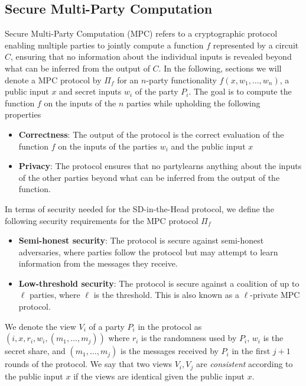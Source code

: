 \documentclass[twoside,11pt,openright]{report}
\theoremstyle{definition}
\theoremstyle{plain}
\begin{document}
\subsection{Secure Multi-Party Computation}\label{sec:mpc}

Secure Multi-Party Computation (MPC) refers to a cryptographic protocol enabling multiple parties to jointly compute a function $f$ represented by a circuit $C$, ensuring that no information about the individual inputs is revealed beyond what can be inferred from the output of $C$. In the following, sections we will denote a MPC protocol by $\Pi_f$ for an $n$-party functionality $f(x, w_1, \dots, w_n)$, a public input $x$ and secret inputs $w_i$ of the party $P_i$. The goal is to compute the function $f$ on the inputs of the $n$ parties while upholding the following properties~\cite{cramer2015secure}

\begin{itemize}
  \item \textbf{Correctness}: The output of the protocol is the correct evaluation of the function $f$ on the inputs of the parties $w_i$ and the public input $x$
  \item \textbf{Privacy}: The protocol ensures that no partylearns anything about the inputs of the other parties beyond what can be inferred from the output of the function.
\end{itemize}

In terms of security needed for the SD-in-the-Head protocol, we define the following security requirements for the MPC protocol $\Pi_f$

\begin{itemize}
  \item \textbf{Semi-honest security}: The protocol is secure against semi-honest adversaries, where parties follow the protocol but may attempt to learn information from the messages they receive.
  \item \textbf{Low-threshold security}: The protocol is secure against a coalition of up to $\ell$ parties, where $\ell$ is the threshold. This is also known as a $\ell$-private MPC protocol.
\end{itemize}

We denote the view $V_i$ of a party $P_i$ in the protocol as $(i, x, r_i, w_i, (m_1, \dots, m_j))$ where $r_i$ is the randomness used by $P_i$, $w_i$ is the secret share, and $(m_1, \dots, m_j)$ is the messages received by $P_i$ in the first $j+1$ rounds of the protocol. We say that two views $V_i, V_j$ are \textit{consistent} according to the public input $x$ if the views are identical given the public input $x$.
\end{document}
